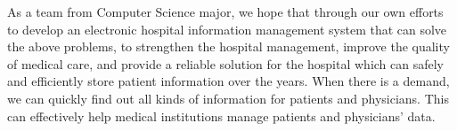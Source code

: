 As a team from Computer Science major, we hope that through our own efforts to develop an electronic hospital information management system that can solve the above problems, to strengthen the hospital management, improve the quality of medical care, and provide a reliable solution for the hospital which can safely and efficiently store patient information over the years. When there is a demand, we can quickly find out all kinds of information for patients and physicians. This can effectively help medical institutions manage patients and physicians’ data.